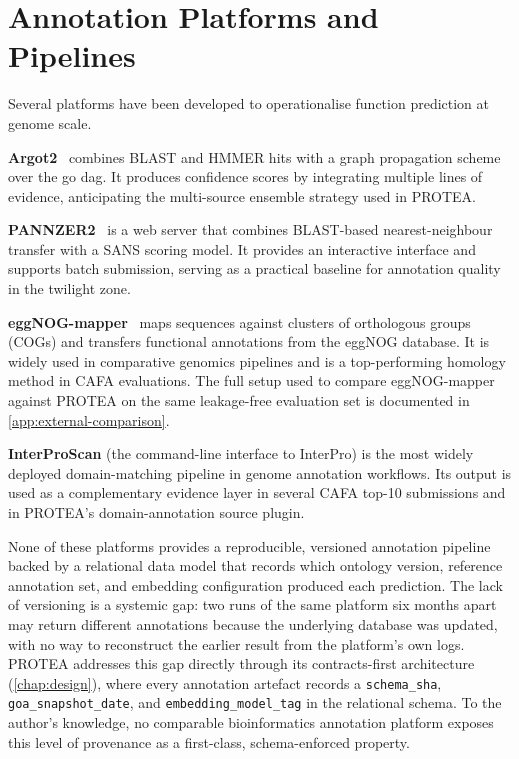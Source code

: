 \section{Annotation Platforms and Pipelines}
\label{sec:related-platforms}

Several platforms have been developed to operationalise function prediction at
genome scale.

\textbf{Argot2}~\cite{falda2012argot2} combines BLAST and HMMER hits with a
graph propagation scheme over the \gls{go} \gls{dag}. It produces confidence
scores by integrating multiple lines of evidence, anticipating the multi-source
ensemble strategy used in PROTEA.

\textbf{PANNZER2}~\cite{toronen2018pannzer2} is a web server that combines
BLAST-based nearest-neighbour transfer with a SANS scoring model. It provides an
interactive interface and supports batch submission, serving as a practical
baseline for annotation quality in the twilight zone.

\textbf{eggNOG-mapper}~\cite{cantalapiedra2021eggnogmapper} maps sequences
against clusters of orthologous groups (COGs) and transfers functional
annotations from the eggNOG database. It is widely used in comparative genomics
pipelines and is a top-performing homology method in CAFA evaluations.
The full setup used to compare eggNOG-mapper against PROTEA on the same
leakage-free evaluation set is documented in \cref{app:external-comparison}.

\textbf{InterProScan} (the command-line interface to InterPro) is the most widely
deployed domain-matching pipeline in genome annotation workflows. Its output is
used as a complementary evidence layer in several CAFA top-10 submissions and in
PROTEA's domain-annotation source plugin.

None of these platforms provides a reproducible, versioned annotation pipeline
backed by a relational data model that records which ontology version, reference
annotation set, and embedding configuration produced each prediction. The lack of
versioning is a systemic gap: two runs of the same platform six months apart may
return different annotations because the underlying database was updated, with no
way to reconstruct the earlier result from the platform's own logs. PROTEA
addresses this gap directly through its contracts-first architecture
(\cref{chap:design}), where every annotation artefact records a
\texttt{schema\_sha}, \texttt{goa\_snapshot\_date}, and
\texttt{embedding\_model\_tag} in the relational schema. To the author's
knowledge, no comparable bioinformatics annotation platform exposes this level of
provenance as a first-class, schema-enforced property.


